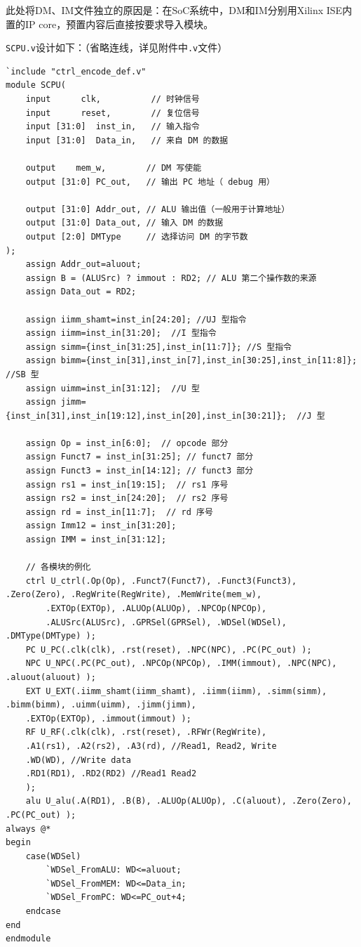 \documentclass[UTF8,a4paper,autofakebold,15pt]{ctexart}
\begin{document}
此处将DM、IM文件独立的原因是：在SoC系统中，DM和IM分别用Xilinx ISE内置的IP core，预置内容后直接按要求导入模块。

{\tt SCPU.v}设计如下：（省略连线，详见附件中{\tt .v}文件）

{\lstset{language=verilog}
\begin{lstlisting}
`include "ctrl_encode_def.v"
module SCPU(
	input      clk,          // 时钟信号
	input      reset,        // 复位信号
	input [31:0]  inst_in,   // 输入指令
	input [31:0]  Data_in,   // 来自 DM 的数据

	output    mem_w,        // DM 写使能
	output [31:0] PC_out,   // 输出 PC 地址（ debug 用）

	output [31:0] Addr_out, // ALU 输出值（一般用于计算地址）
	output [31:0] Data_out, // 输入 DM 的数据
	output [2:0] DMType     // 选择访问 DM 的字节数
);
	assign Addr_out=aluout;
	assign B = (ALUSrc) ? immout : RD2; // ALU 第二个操作数的来源
	assign Data_out = RD2;
	
	assign iimm_shamt=inst_in[24:20]; //UJ 型指令
	assign iimm=inst_in[31:20];  //I 型指令
	assign simm={inst_in[31:25],inst_in[11:7]}; //S 型指令
	assign bimm={inst_in[31],inst_in[7],inst_in[30:25],inst_in[11:8]};  //SB 型
	assign uimm=inst_in[31:12];  //U 型
	assign jimm={inst_in[31],inst_in[19:12],inst_in[20],inst_in[30:21]};  //J 型
	
	assign Op = inst_in[6:0];  // opcode 部分
	assign Funct7 = inst_in[31:25]; // funct7 部分
	assign Funct3 = inst_in[14:12]; // funct3 部分
	assign rs1 = inst_in[19:15];  // rs1 序号
	assign rs2 = inst_in[24:20];  // rs2 序号
	assign rd = inst_in[11:7];  // rd 序号
	assign Imm12 = inst_in[31:20];
	assign IMM = inst_in[31:12];
	
	// 各模块的例化
	ctrl U_ctrl(.Op(Op), .Funct7(Funct7), .Funct3(Funct3), .Zero(Zero), .RegWrite(RegWrite), .MemWrite(mem_w),
		.EXTOp(EXTOp), .ALUOp(ALUOp), .NPCOp(NPCOp), 
		.ALUSrc(ALUSrc), .GPRSel(GPRSel), .WDSel(WDSel), .DMType(DMType) );
	PC U_PC(.clk(clk), .rst(reset), .NPC(NPC), .PC(PC_out) );
	NPC U_NPC(.PC(PC_out), .NPCOp(NPCOp), .IMM(immout), .NPC(NPC), .aluout(aluout) );
	EXT U_EXT(.iimm_shamt(iimm_shamt), .iimm(iimm), .simm(simm), .bimm(bimm), .uimm(uimm), .jimm(jimm),
	.EXTOp(EXTOp), .immout(immout) );
	RF U_RF(.clk(clk), .rst(reset), .RFWr(RegWrite), 
	.A1(rs1), .A2(rs2), .A3(rd), //Read1, Read2, Write
	.WD(WD), //Write data
	.RD1(RD1), .RD2(RD2) //Read1 Read2
	);
	alu U_alu(.A(RD1), .B(B), .ALUOp(ALUOp), .C(aluout), .Zero(Zero), .PC(PC_out) );
always @*
begin
	case(WDSel)
		`WDSel_FromALU: WD<=aluout;
		`WDSel_FromMEM: WD<=Data_in;
		`WDSel_FromPC: WD<=PC_out+4;
	endcase
end
endmodule
\end{lstlisting}}
\end{document}
